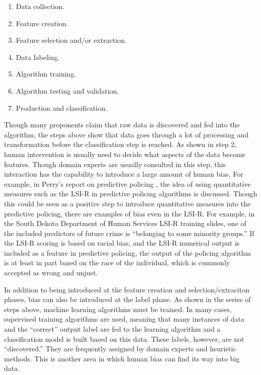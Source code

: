 \documentclass[12pt]{article} %
\begin{document}
\begin{enumerate}
\item Data collection.
\item Feature creation.
\item Feature selection and/or extraction.
\item Data labeling.
\item Algorithm training.
\item Algorithm testing and validation.
\item Production and classification.
\end{enumerate}

Though many proponents claim that raw data is discovered and fed into the algorithm, the steps above show that data goes through a lot of processing and transformation before the classification step is reached. As shown in step 2, human intervention is usually need to decide what aspects of the data become features. Though domain experts are usually consulted in this step, this interaction has the capability to introduce a large amount of human bias. For example, in Perry's report on predictive policing \cite{perryetal}, the idea of using quantitative measures such as the LSI-R in predictive policing algorithms is discussed. Though this could be seen as a positive step to introduce quantitative measures into the predictive policing, there are examples of bias even in the LSI-R. For example, in the South Dekota Department of Human Services LSI-R training slides, one of the included predictors of future crime is ``belonging to some minority groups.'' \cite{dekota} If the LSI-R scoring is based on racial bias, and the LSI-R numerical output is included as a feature in predictive policing, the output of the policing algorithm is at least in part based on the race of the individual, which is commonly accepted as wrong and unjust.  %

In addition to being introduced at the feature creation and selection/extraciton phases, bias can also be introduced at the label phase. As shown in the series of steps above, machine learning algorithms must be trained. In many cases, supervised training algorithms are used, meaning that many instances of data and the ``correct'' output label are fed to the learning algorithm and a classification model is built based on this data. These labels, however, are not ``discovered.'' They are frequently assigned by domain experts and heuristic methods. This is another area in which human bias can find its way into big data.
\end{document}
